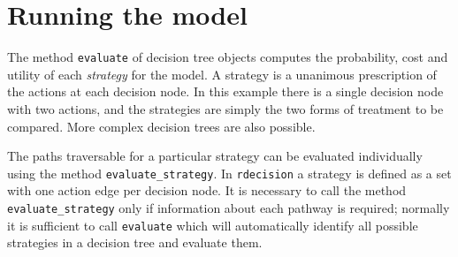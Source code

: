 \documentclass[
]{article}
\newenvironment{Shaded}{\begin{snugshade}}{\end{snugshade}}
\newcommand{\CommentTok}[1]{\textcolor[rgb]{0.56,0.35,0.01}{\textit{#1}}}
\newcommand{\DataTypeTok}[1]{\textcolor[rgb]{0.13,0.29,0.53}{#1}}
\newcommand{\KeywordTok}[1]{\textcolor[rgb]{0.13,0.29,0.53}{\textbf{#1}}}
\newcommand{\NormalTok}[1]{#1}
\newcommand{\OperatorTok}[1]{\textcolor[rgb]{0.81,0.36,0.00}{\textbf{#1}}}
\newcommand{\StringTok}[1]{\textcolor[rgb]{0.31,0.60,0.02}{#1}}
\begin{document}
\begin{Shaded}
\end{Shaded}

\hypertarget{running-the-model}{%
\section{Running the model}\label{running-the-model}}

The method \texttt{evaluate} of decision tree objects computes the
probability, cost and utility of each \emph{strategy} for the model. A
strategy is a unanimous prescription of the actions at each decision
node. In this example there is a single decision node with two actions,
and the strategies are simply the two forms of treatment to be compared.
More complex decision trees are also possible.

The paths traversable for a particular strategy can be evaluated
individually using the method \texttt{evaluate\_strategy}. In
\texttt{rdecision} a strategy is defined as a set with one action edge
per decision node. It is necessary to call the method
\texttt{evaluate\_strategy} only if information about each pathway is
required; normally it is sufficient to call \texttt{evaluate} which will
automatically identify all possible strategies in a decision tree and
evaluate them.
\end{document}
